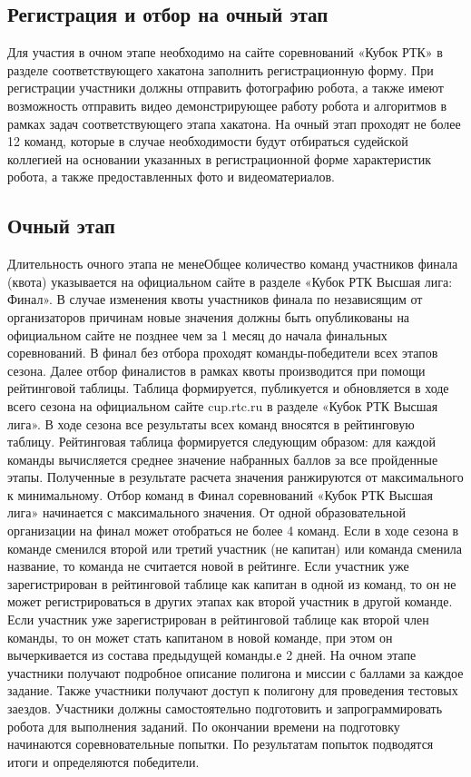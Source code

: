 \documentclass[12pt]{article}
\begin{document}
\subsection{Регистрация и отбор на очный этап} \hspace*{1cm}
Для участия в очном этапе необходимо на сайте соревнований «Кубок РТК» в разделе соответствующего хакатона заполнить регистрационную форму.
При регистрации участники должны отправить фотографию робота, а также имеют возможность отправить видео демонстрирующее работу робота и алгоритмов в рамках задач соответствующего этапа хакатона.
На очный этап проходят не более 12 команд, которые в случае необходимости будут отбираться судейской коллегией на основании указанных в регистрационной форме характеристик робота, а также предоставленных фото и видеоматериалов.

\subsection{Очный этап} \hspace*{1cm}
Длительность очного этапа не менеОбщее количество команд участников финала (квота) указывается на официальном сайте в разделе «Кубок РТК Высшая лига: Финал». В случае изменения квоты участников финала по независящим от организаторов причинам новые значения должны быть опубликованы на официальном сайте не позднее чем за 1 месяц до начала финальных соревнований.
В финал без отбора проходят команды-победители всех этапов сезона. Далее отбор финалистов в рамках квоты производится при помощи рейтинговой таблицы. Таблица формируется, публикуется и обновляется в ходе всего сезона на официальном сайте cup.rtc.ru в разделе «Кубок РТК Высшая лига». В ходе сезона все результаты всех команд вносятся в рейтинговую таблицу. Рейтинговая таблица формируется следующим образом: для каждой команды вычисляется среднее значение набранных баллов за все пройденные этапы. Полученные в результате расчета значения ранжируются от максимального к минимальному. Отбор команд в Финал соревнований «Кубок РТК Высшая лига» начинается с максимального значения.
От одной образовательной организации на финал может отобраться не более 
4 команд.
Если в ходе сезона в команде сменился второй или третий участник (не капитан) или команда сменила название, то команда не считается новой в рейтинге. Если участник уже зарегистрирован в рейтинговой таблице как капитан в одной из команд, то он не может регистрироваться в других этапах как второй участник в другой команде. Если участник уже зарегистрирован в рейтинговой таблице как второй член команды, то он может стать капитаном в новой команде, при этом он вычеркивается из состава предыдущей команды.е 2 дней.
На очном этапе участники получают подробное описание полигона и миссии с баллами за каждое задание. Также участники получают доступ к полигону для проведения тестовых заездов.
Участники должны самостоятельно подготовить и запрограммировать робота для выполнения заданий. По окончании времени на подготовку начинаются соревновательные попытки. По результатам попыток подводятся итоги и определяются победители.
\end{document}
